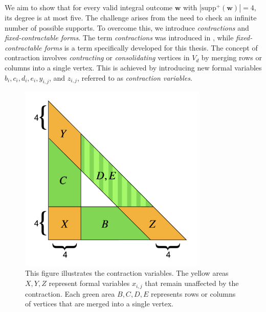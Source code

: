We aim to show that for every valid integral outcome \( \mathbf{w} \) with \( |\mathrm{supp}^+(\mathbf{w})| = 4 \), its degree is at most five. The challenge arises from the need to check an infinite number of possible supports. To overcome this, we introduce \emph{contractions} and \emph{fixed-contractable forms}. The term \emph{contractions} was introduced in \cite{bik2022classifying}, while \emph{fixed-contractable forms} is a term specifically developed for this thesis. The concept of contraction involves \emph{contracting} or \emph{consolidating} vertices in \( V_d \) by merging rows or columns into a single vertex. This is achieved by introducing new formal variables \( b_{i}, c_{i}, d_{i}, e_{i}, y_{i,j} \), and \( z_{i,j} \), referred to as \emph{contraction variables}.

\begin{figure}[H]
    \centering
    \includegraphics[width=0.8\textwidth]{assets/contactions-4.png}
    \caption{This figure illustrates the contraction variables. The yellow areas \( X, Y, Z \) represent formal variables \( x_{i,j} \) that remain unaffected by the contraction. Each green area \( B, C, D, E \) represents rows or columns of vertices that are merged into a single vertex.}\label{fig:contractions-42342432}
\end{figure}

